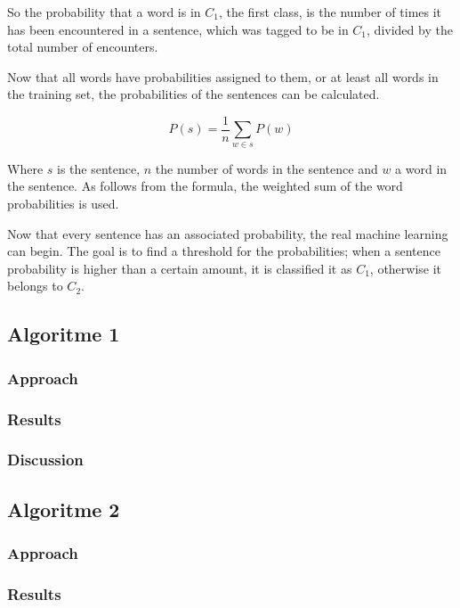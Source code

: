 \documentclass[11pt]{article}
\begin{document}
So the probability that a word is in $C_1$, the first class, is the number of times it has been encountered in a sentence, which was tagged to be in $C_1$, divided by the total number of encounters.

Now that all words have probabilities assigned to them, or at least all words in the training set, the probabilities of the sentences can be calculated.

\begin{equation}
P(s) = \frac{1}{n} \sum_{w \in s} P(w)
\end{equation}

Where $s$ is the sentence, $n$ the number of words in the sentence and $w$ a word in the sentence. As follows from the formula,  the weighted sum of the word probabilities is used.

Now that every sentence has an associated probability, the real machine learning can begin. The goal is to find a threshold for the probabilities; when a sentence probability is higher than a certain amount, it is classified it as $C_1$,  otherwise it belongs to $C_2$.

\subsection{Algoritme 1}
\subsubsection{Approach}

\subsubsection{Results}

\subsubsection{Discussion}

\subsection{Algoritme 2}
\subsubsection{Approach}

\subsubsection{Results}
\end{document}
